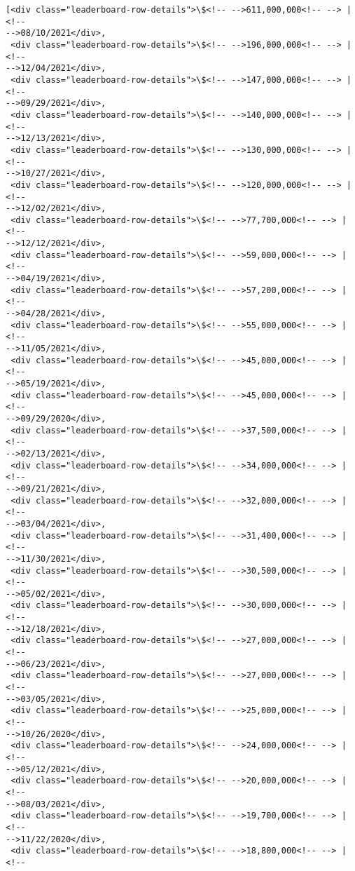 \documentclass[11pt]{article}
\makeatletter
\newcommand{\boxspacing}{\kern\kvtcb@left@rule\kern\kvtcb@boxsep}
\newcommand{\prompt}[4]{
        {\ttfamily\llap{{\color{#2}[#3]:\hspace{3pt}#4}}\vspace{-\baselineskip}}
    }
\makeatother
\begin{document}
            \begin{tcolorbox}[breakable, size=fbox, boxrule=.5pt, pad at break*=1mm, opacityfill=0]
\prompt{Out}{outcolor}{23}{\boxspacing}
\begin{Verbatim}[commandchars=\\\{\}]
[<div class="leaderboard-row-details">\$<!-- -->611,000,000<!-- --> | <!--
-->08/10/2021</div>,
 <div class="leaderboard-row-details">\$<!-- -->196,000,000<!-- --> | <!--
-->12/04/2021</div>,
 <div class="leaderboard-row-details">\$<!-- -->147,000,000<!-- --> | <!--
-->09/29/2021</div>,
 <div class="leaderboard-row-details">\$<!-- -->140,000,000<!-- --> | <!--
-->12/13/2021</div>,
 <div class="leaderboard-row-details">\$<!-- -->130,000,000<!-- --> | <!--
-->10/27/2021</div>,
 <div class="leaderboard-row-details">\$<!-- -->120,000,000<!-- --> | <!--
-->12/02/2021</div>,
 <div class="leaderboard-row-details">\$<!-- -->77,700,000<!-- --> | <!--
-->12/12/2021</div>,
 <div class="leaderboard-row-details">\$<!-- -->59,000,000<!-- --> | <!--
-->04/19/2021</div>,
 <div class="leaderboard-row-details">\$<!-- -->57,200,000<!-- --> | <!--
-->04/28/2021</div>,
 <div class="leaderboard-row-details">\$<!-- -->55,000,000<!-- --> | <!--
-->11/05/2021</div>,
 <div class="leaderboard-row-details">\$<!-- -->45,000,000<!-- --> | <!--
-->05/19/2021</div>,
 <div class="leaderboard-row-details">\$<!-- -->45,000,000<!-- --> | <!--
-->09/29/2020</div>,
 <div class="leaderboard-row-details">\$<!-- -->37,500,000<!-- --> | <!--
-->02/13/2021</div>,
 <div class="leaderboard-row-details">\$<!-- -->34,000,000<!-- --> | <!--
-->09/21/2021</div>,
 <div class="leaderboard-row-details">\$<!-- -->32,000,000<!-- --> | <!--
-->03/04/2021</div>,
 <div class="leaderboard-row-details">\$<!-- -->31,400,000<!-- --> | <!--
-->11/30/2021</div>,
 <div class="leaderboard-row-details">\$<!-- -->30,500,000<!-- --> | <!--
-->05/02/2021</div>,
 <div class="leaderboard-row-details">\$<!-- -->30,000,000<!-- --> | <!--
-->12/18/2021</div>,
 <div class="leaderboard-row-details">\$<!-- -->27,000,000<!-- --> | <!--
-->06/23/2021</div>,
 <div class="leaderboard-row-details">\$<!-- -->27,000,000<!-- --> | <!--
-->03/05/2021</div>,
 <div class="leaderboard-row-details">\$<!-- -->25,000,000<!-- --> | <!--
-->10/26/2020</div>,
 <div class="leaderboard-row-details">\$<!-- -->24,000,000<!-- --> | <!--
-->05/12/2021</div>,
 <div class="leaderboard-row-details">\$<!-- -->20,000,000<!-- --> | <!--
-->08/03/2021</div>,
 <div class="leaderboard-row-details">\$<!-- -->19,700,000<!-- --> | <!--
-->11/22/2020</div>,
 <div class="leaderboard-row-details">\$<!-- -->18,800,000<!-- --> | <!--

\end{Verbatim}
\end{tcolorbox}
\end{document}
